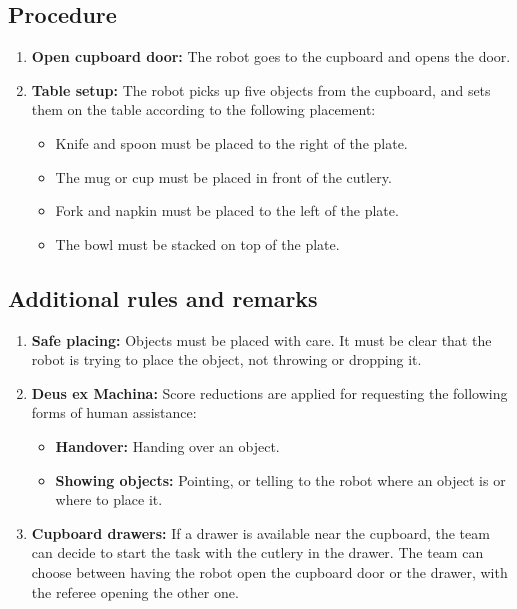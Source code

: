 \subsection*{Procedure}
\begin{enumerate}[nosep]

	\item \textbf{Open cupboard door:} The robot goes to the cupboard and opens the door.
	\item \textbf{Table setup:} The robot picks up five objects from the cupboard, and sets them on the table according to the following placement: 
		\begin{itemize}[nosep]
		 \item Knife and spoon must be placed to the right of the plate.
		 \item The mug or cup must be placed in front of the cutlery.
		 \item Fork and napkin must be placed to the left of the plate.
		 \item The bowl must be stacked on top of the plate.
		\end{itemize}

\end{enumerate}



\subsection*{Additional rules and remarks}
\begin{enumerate}[nosep]
	\item \textbf{Safe placing:} Objects must be placed with care. It must be clear that the robot is trying to place the object, not throwing or dropping it.

	\item \textbf{Deus ex Machina:} Score reductions are applied for requesting the following forms of human assistance:
	\begin{itemize}[nosep]
		\item \textbf{Handover:} Handing over an object.
		
		\item \textbf{Showing objects:} Pointing, or telling to the robot where an object is or where to place it.

	\end{itemize}

	\item \textbf{Cupboard drawers:} If a drawer is available near the cupboard, the team can decide to start the task with the cutlery in the drawer. The team can choose between having the robot open the cupboard door or the drawer, with the referee opening the other one.

\end{enumerate}

